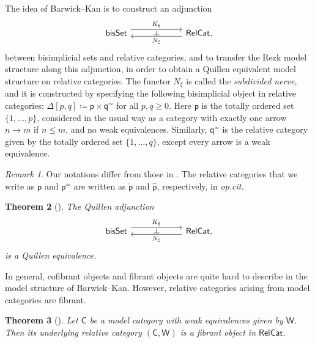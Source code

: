 \documentclass[a4paper,12pt]{amsart}
\theoremstyle{plain}
\newtheorem{theorem}{Theorem}[section]
\theoremstyle{definition}
\theoremstyle{remark}
\newtheorem{remark}[theorem]{\sc Remark}%
\begin{document}
The idea of Barwick--Kan is to construct an adjunction 
\[
\begin{tikzcd}[column sep=5pc,row sep=3pc]
         \mathsf{bisSet} \arrow[r, shift left=1.1ex, "K_{\xi}"{name=F}] & \mathsf{RelCat} , \arrow[l, shift left=.75ex, "N_{\xi}"{name=U}]
            \arrow[phantom, from=F, to=U, , "\dashv" rotate=-90]
\end{tikzcd}
\]
between bisimplicial sets and relative categories, and to transfer the Rezk model structure along this adjunction, in order to obtain a Quillen equivalent model structure on relative categories. The functor $N_{\xi}$ is called the\textit{ subdivided nerve}, and it is constructed by specifying the following bisimplicial object in relative categories: $\Delta[p,q] \coloneqq \mathsf{p}\times\mathsf{q}^{\simeq}$ for all $p,q \geq 0$. Here $\mathsf{p}$ is the totally ordered set $\{1,\dots, p\}$, considered in the usual way as a category with exactly one arrow $n \longrightarrow m$ if $n \leq m$, and no weak equivalences. Similarly, $\mathsf{q}^{\simeq}$ is the relative category given by the totally ordered set $\{1,\dots, q\}$, except every arrow is a weak equivalence. 

\begin{remark}
    Our notations differ from those in \cite{BarwickKan1}. The relative categories that we write as $\mathsf{p}$ and $\mathsf{p}^\simeq$ are written as $\check{\mathsf{p}}$ and $\hat{\mathsf{p}}$, respectively, in \textit{op.cit.}
\end{remark}

\begin{theorem}[\cite{BarwickKan1}]
The Quillen adjunction 
\[
\begin{tikzcd}[column sep=5pc,row sep=3pc]
         \mathsf{bisSet} \arrow[r, shift left=1.1ex, "K_{\xi}"{name=F}] & \mathsf{RelCat} , \arrow[l, shift left=.75ex, "N_{\xi}"{name=U}]
            \arrow[phantom, from=F, to=U, , "\dashv" rotate=-90]
\end{tikzcd}
\]
is a Quillen equivalence. 
\end{theorem}

In general, cofibrant objects and fibrant objects are quite hard to describe in the model structure of Barwick--Kan. However, relative categories arising from model categories are fibrant.

\begin{theorem}[{\cite[Main Theorem]{Meier16}}]
Let $\mathsf{C}$ be a model category with weak equivalences given by $\mathsf{W}$. Then its underlying relative category $(\mathsf{C},\mathsf{W})$ is a fibrant object in $\mathsf{RelCat}$. 
\end{theorem}
\end{document}
